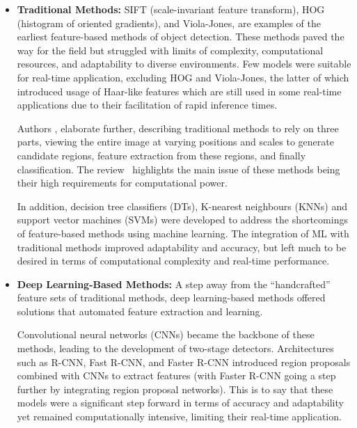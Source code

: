 \begin{itemize}
	\item \textbf{Traditional Methods:}
	      SIFT (scale-invariant feature transform),
	      HOG (histogram of oriented gradients), and Viola-Jones, are examples of
	      the earliest feature-based methods of object detection. These methods
	      paved the way for the field but struggled with limits of complexity,
	      computational resources, and adaptability to diverse environments.
	      Few models were suitable for real-time application, excluding HOG and Viola-Jones,
	      the latter of which introduced usage of Haar-like features which are still used
	      in some real-time applications due to their facilitation of rapid inference times.

	      Authors \citeauthor{pathak2023object}, elaborate further, describing
	      traditional methods to rely on three parts, viewing the entire image at varying
	      positions and scales to generate candidate regions, feature extraction from
	      these regions, and finally classification. The review~\citep{pathak2023object}
	      highlights the main issue of these methods being their high requirements for
	      computational power.

	      In addition, decision tree classifiers (DTs), K-nearest neighbours (KNNs) and
	      support vector machines (SVMs) were developed to address the shortcomings of
	      feature-based methods using machine learning. The integration of ML with
	      traditional methods improved adaptability and accuracy, but left much to be
	      desired in terms of computational complexity and real-time performance.
	\item \textbf{Deep Learning-Based Methods:}
	      A step away from the \enquote{handcrafted}
	      feature sets of traditional methods, deep learning-based methods offered solutions
	      that automated feature extraction and learning.

	      Convolutional neural networks (CNNs) became the backbone of these methods,
	      leading to the development of two-stage detectors. Architectures such as R-CNN,
	      Fast R-CNN, and Faster R-CNN introduced region proposals combined with CNNs to
	      extract features (with Faster R-CNN going a step further by integrating region
	      proposal networks). This is to say that these models were a significant step
	      forward in terms of accuracy and adaptability yet remained computationally
	      intensive, limiting their real-time application.


\end{itemize}
